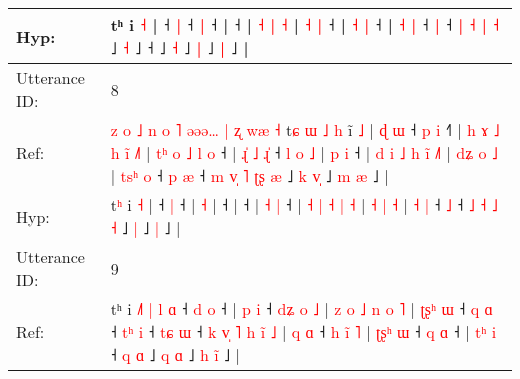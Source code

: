 \documentclass[10pt]{article}
\DeclareRobustCommand{\hl}[1]{{\textcolor{red}{#1}}}
\begin{document}
\begin{longtable}{ll}
 \\
Hyp: & tʰ i \hl{}\hl{˧} |\hl{}\hl{}\hl{}\hl{} ˧\hl{}\hl{} \hl{|} ˧\hl{}\hl{} \hl{|} ˧ |\hl{}\hl{}\hl{}\hl{} ˧\hl{}\hl{}\hl{}\hl{}\hl{}\hl{}\hl{}\hl{}\hl{}\hl{}\hl{}\hl{}\hl{}\hl{}\hl{} | \hl{˧} \hl{|} \hl{}\hl{˧} |\hl{}\hl{}\hl{}\hl{}\hl{} \hl{˧} \hl{|} ˧ | \hl{}\hl{}\hl{˧} \hl{|} ˧ | \hl{˧} \hl{|} ˧\hl{}\hl{}\hl{} \hl{|} ˧\hl{}\hl{} \hl{|} \hl{˧} \hl{|} \hl{˧} ˩\hl{}\hl{}\hl{}\hl{} \hl{˧} ˩\hl{}\hl{}\hl{}\hl{}\hl{}\hl{} ˧\hl{}\hl{}\hl{}\hl{} ˩\hl{}\hl{} \hl{˧} ˩\hl{}\hl{} \hl{|} ˩\hl{}\hl{} \hl{|} ˩ |
 \\
\midrule
Utterance ID: & 8 \\
Ref: & \hl{z}\hl{ }\hl{o}\hl{ }\hl{˩}\hl{ }\hl{n}\hl{ }\hl{o}\hl{ }\hl{˥}\hl{ }\hl{ə}\hl{ə}\hl{ə}\hl{…}\hl{ }\hl{|}\hl{ }\hl{ʐ}\hl{ }\hl{w}\hl{æ}\hl{ }\hl{˧}\hl{ }t\hl{ɕ}\hl{ }\hl{ɯ}\hl{ }\hl{˩}\hl{ }\hl{h} i\hl{̃} \hl{˩} |\hl{ }\hl{ɖ}\hl{ }\hl{ɯ} ˧\hl{ }\hl{p} \hl{i} ˧\hl{˥} |\hl{ }\hl{h}\hl{ }\hl{ɤ}\hl{ }\hl{˩}\hl{ }\hl{h}\hl{ }\hl{i}\hl{̃} \hl{˩}\hl{˥} |\hl{ }\hl{t}\hl{ʰ}\hl{ }\hl{o}\hl{ }\hl{˩}\hl{ }\hl{l}\hl{ }\hl{o} ˧ |\hl{ }\hl{ɻ}\hl{̍}\hl{ }\hl{˩}\hl{ }\hl{ɻ}\hl{̍} ˧\hl{ }\hl{l}\hl{ }\hl{o}\hl{ }\hl{˩} | \hl{p} \hl{i} ˧ |\hl{ }\hl{d} \hl{i} \hl{˩} \hl{h} \hl{i}\hl{̃} \hl{˩}\hl{˥} | \hl{d}\hl{ʑ} \hl{o} \hl{˩} | \hl{t}\hl{s}\hl{ʰ} \hl{o} ˧\hl{ }\hl{p} \hl{æ} ˧\hl{ }\hl{m} \hl{v}\hl{̩} \hl{˥} \hl{ʈ}\hl{ʂ} \hl{æ} ˩\hl{ }\hl{k} \hl{v}\hl{̩} ˩\hl{ }\hl{m} \hl{æ} ˩ |
 \\
Hyp: & \hl{}\hl{}\hl{}\hl{}\hl{}\hl{}\hl{}\hl{}\hl{}\hl{}\hl{}\hl{}\hl{}\hl{}\hl{}\hl{}\hl{}\hl{}\hl{}\hl{}\hl{}\hl{}\hl{}\hl{}\hl{}\hl{}t\hl{}\hl{}\hl{}\hl{}\hl{}\hl{}\hl{ʰ} i\hl{} \hl{˧} |\hl{}\hl{}\hl{}\hl{} ˧\hl{}\hl{} \hl{|} ˧\hl{} |\hl{}\hl{}\hl{}\hl{}\hl{}\hl{}\hl{}\hl{}\hl{}\hl{}\hl{} \hl{}\hl{˧} |\hl{}\hl{}\hl{}\hl{}\hl{}\hl{}\hl{}\hl{}\hl{}\hl{}\hl{} ˧ |\hl{}\hl{}\hl{}\hl{}\hl{}\hl{}\hl{}\hl{} ˧\hl{}\hl{}\hl{}\hl{}\hl{}\hl{} | \hl{˧} \hl{|} ˧ |\hl{}\hl{} \hl{˧} \hl{|} \hl{˧} \hl{}\hl{|} \hl{}\hl{˧} | \hl{}\hl{˧} \hl{|} \hl{˧} | \hl{}\hl{}\hl{˧} \hl{|} ˧\hl{}\hl{} \hl{˩} ˧\hl{}\hl{} \hl{}\hl{˩} \hl{˧} \hl{}\hl{˩} \hl{˧} ˩\hl{}\hl{} \hl{}\hl{|} ˩\hl{}\hl{} \hl{|} ˩ |
 \\
\midrule
Utterance ID: & 9 \\
Ref: & tʰ i\hl{ }\hl{˩}\hl{˥}\hl{ }\hl{|}\hl{ }\hl{l}\hl{ }\hl{ɑ} ˧\hl{ }\hl{d} \hl{o} ˧ |\hl{ }\hl{p}\hl{ }\hl{i} ˧\hl{ }\hl{d}\hl{ʑ}\hl{ }\hl{o}\hl{ }\hl{˩} |\hl{ }\hl{z}\hl{ }\hl{o}\hl{ }\hl{˩}\hl{ }\hl{n}\hl{ }\hl{o} \hl{˥} |\hl{ }\hl{ʈ}\hl{ʂ}\hl{ʰ}\hl{ }\hl{ɯ} ˧\hl{ }\hl{q} \hl{ɑ} ˧\hl{ }\hl{t}\hl{ʰ} \hl{i} ˧\hl{ }\hl{t}\hl{ɕ} \hl{ɯ} ˧\hl{ }\hl{k}\hl{ }\hl{v}\hl{̩}\hl{ }\hl{˥}\hl{ }\hl{h}\hl{ }\hl{i}\hl{̃}\hl{ }\hl{˩} |\hl{ }\hl{q}\hl{ }\hl{ɑ} ˧\hl{ }\hl{h}\hl{ }\hl{i}\hl{̃}\hl{ }\hl{˥} |\hl{ }\hl{ʈ}\hl{ʂ}\hl{ʰ}\hl{ }\hl{ɯ} ˧\hl{ }\hl{q} \hl{ɑ} ˧ | \hl{t}\hl{ʰ} \hl{i} ˧ \hl{q} \hl{ɑ} ˩\hl{ }\hl{q} \hl{ɑ} ˩\hl{ }\hl{h} \hl{i}\hl{̃} ˩ |

\end{longtable}
\end{document}
